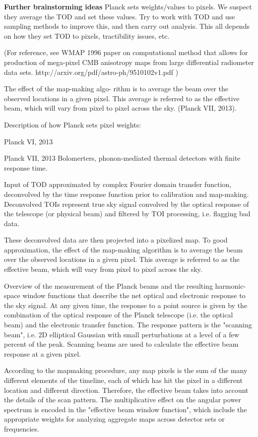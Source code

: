 \documentclass[a4paper, 11pt]{article}
\begin{document}
\textbf{Further brainstorming ideas}
Planck sets weights/values to pixels. We suspect they average the TOD and set these values. Try to work with TOD and use sampling methods to improve this, and then carry out analysis. This all depends on how they set TOD to pixels, tractibility issues, etc. 

(For reference, see WMAP 1996 paper on computational method that allows for production of mega-pixel CMB anisotropy maps from large differential radiometer data sets. http://arxiv.org/pdf/astro-ph/9510102v1.pdf )

The effect of the map-making algo- rithm is to average the beam over the observed locations in a given pixel. This average is referred to as the effective beam, which will vary from pixel to pixel across the sky. (Planck VII, 2013). 


Description of how Planck sets pixel weights: 

Planck VI, 2013

Planck VII, 2013
Bolomerters, phonon-mediated thermal detectors with finite response time. 

Input of TOD approximated by complex Fourier domain transfer function, deconvolved by the time response function prior to calibration and map-making. Deconvolved TOIs represent true sky signal convolved by the optical response of the telescope (or physical beam) and filtered by TOI processing, i.e. flagging bad data. 

These deconvolved data are then projected into a pixelized map. To good approximation, the effect of the map-making algorithm is to average the beam over the observed locations in a given pixel. This average is referred to as the effective beam, which will vary from pixel to pixel across the sky. 

Overview of the measurement of the Planck beams and the resulting harmonic-space window functions that describe the net optical and electronic response to the sky signal. At any given time, the response to a point source is given by the combination of the optical response of the Planck telescope (i.e. the optical beam) and the electronic transfer function. The response pattern is the "scanning beam", i.e. 2D elliptical Gaussian with small perturbations at a level of a few percent of the peak. Scanning beams are used to calculate the effective beam response at a given pixel.  

According to the mapmaking procedure, any map pixels is the sum of the many different elements of the timeline, each of which has hit the pixel in a different location and different direction. Therefore, the effective beam takes into account the details of the scan pattern. The multiplicative effect on the angular power spectrum is encoded in the "effective beam window function", which include the appropriate weights for analyzing aggregate maps across detector sets or frequencies. 
\end{document}

